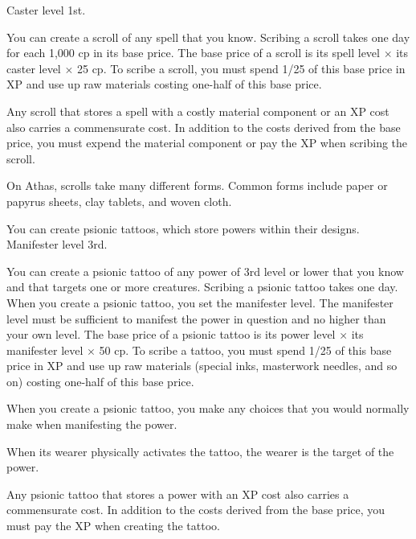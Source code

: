 {}
{Caster level 1st.}
{You can create a scroll of any spell that you know. Scribing a scroll takes one day for each 1,000 cp in its base price. The base price of a scroll is its spell level $\times$ its caster level $\times$ 25 cp. To scribe a scroll, you must spend 1/25 of this base price in XP and use up raw materials costing one-half of this base price.

Any scroll that stores a spell with a costly material component or an XP cost also carries a commensurate cost. In addition to the costs derived from the base price, you must expend the material component or pay the XP when scribing the scroll.}
{}
{On Athas, scrolls take many different forms. Common forms include paper or papyrus sheets, clay tablets, and woven cloth.}

{You can create psionic tattoos, which store powers within their designs.}
{Manifester level 3rd.}
{You can create a psionic tattoo of any power of 3rd level or lower that you know and that targets one or more creatures. Scribing a psionic tattoo takes one day. When you create a psionic tattoo, you set the manifester level. The manifester level must be sufficient to manifest the power in question and no higher than your own level. The base price of a psionic tattoo is its power level $\times$ its manifester level $\times$ 50 cp. To scribe a tattoo, you must spend 1/25 of this base price in XP and use up raw materials (special inks, masterwork needles, and so on) costing one-half of this base price.

When you create a psionic tattoo, you make any choices that you would normally make when manifesting the power.

When its wearer physically activates the tattoo, the wearer is the target of the power.

Any psionic tattoo that stores a power with an XP cost also carries a commensurate cost. In addition to the costs derived from the base price, you must pay the XP when creating the tattoo.}{}{}
